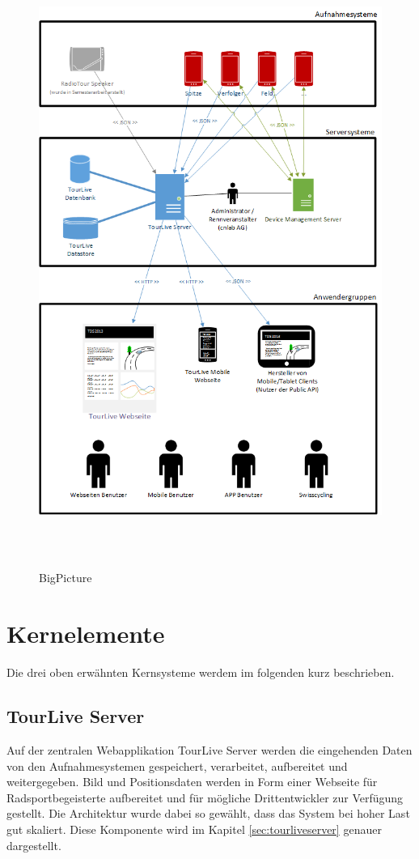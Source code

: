 \begin{figure}[H]
	\centering
	\includegraphics[height=200mm]{images/BigPicture.png}
	\caption{BigPicture}
\end{figure}

\pagebreak

\section{Kernelemente}
Die drei oben erwähnten Kernsysteme werdem im folgenden kurz beschrieben.

\subsection{TourLive Server}
Auf der zentralen Webapplikation TourLive Server werden die eingehenden Daten von den Aufnahmesystemen gespeichert, verarbeitet, aufbereitet und weitergegeben. Bild und Positionsdaten werden in Form einer Webseite für Radsportbegeisterte aufbereitet und für mögliche Drittentwickler zur Verfügung gestellt. Die Architektur wurde dabei so gewählt, dass das System bei hoher Last gut skaliert. Diese Komponente wird im Kapitel \ref{sec:tourliveserver} genauer dargestellt.

